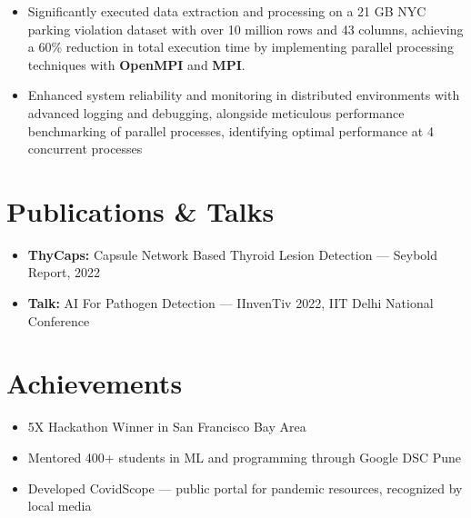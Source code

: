 \documentclass[letterpaper,10pt]{article}
\newcommand{\resumeItem}[1]{
  \item[$\vcenter{\hbox{\tiny$\bullet$}}$]\small{
    #1 \vspace{-2pt}
  }
}
\newcommand{\resumeItemListStart}{\begin{itemize}}
\newcommand{\resumeItemListEnd}{\end{itemize}\vspace{-5pt}}
\begin{document}
\resumeItemListStart
\resumeItem{Significantly executed data extraction and processing on a 21 GB NYC parking violation dataset with over 10 million rows and 43 columns, achieving a 60\% reduction in total execution time by implementing parallel processing techniques with \textbf{OpenMPI} and \textbf{MPI}.}
\resumeItem{Enhanced system reliability and monitoring in distributed environments with advanced logging and debugging, alongside meticulous performance benchmarking of parallel processes, identifying optimal performance at 4 concurrent processes}
\resumeItemListEnd

\section{\textbf{Publications \& Talks}}
\begin{itemize}[leftmargin=0.15in, label={}]
  \item \textbf{ThyCaps:} Capsule Network Based Thyroid Lesion Detection — Seybold Report, 2022
  \item \textbf{Talk:} AI For Pathogen Detection — IInvenTiv 2022, IIT Delhi National Conference
\end{itemize}

\section{\textbf{Achievements}}
\resumeItemListStart
  \resumeItem{5X Hackathon Winner in San Francisco Bay Area}
  \resumeItem{Mentored 400+ students in ML and programming through Google DSC Pune}
  \resumeItem{Developed CovidScope — public portal for pandemic resources, recognized by local media}
\resumeItemListEnd
\end{document}
